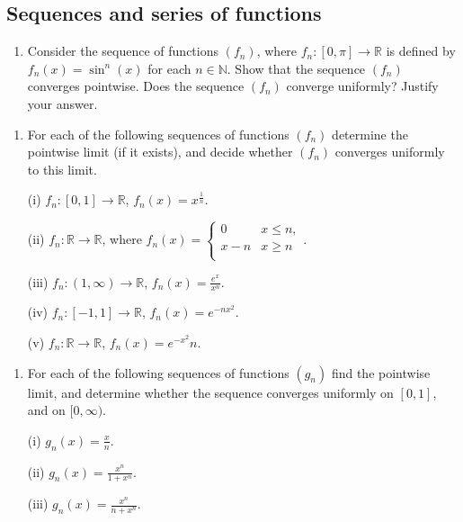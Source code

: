 \documentclass[letterpaper,10pt,english]{jupyterBook}
\begin{document}
\subsection{Sequences and series of functions}
\label{\detokenize{Problems:sequences-and-series-of-functions}}\label{\detokenize{Problems:id54}}\begin{enumerate}
%
\setcounter{enumi}{53}
\item {} 
\sphinxAtStartPar
Consider the sequence of functions  \((f_n)\), where \(f_n:[0,\pi ]\to \mathbb{R}\) is defined by \(f_n(x) = \sin^n (x)\) for each \(n\in\mathbb{N}\). Show that the sequence \((f_n)\) converges pointwise. Does the sequence \((f_n)\)  converge uniformly? Justify your answer.

\end{enumerate}
\label{\detokenize{Problems:id55}}\begin{enumerate}
%
\setcounter{enumi}{54}
\item {} 
\sphinxAtStartPar
For each of the following sequences of functions \((f_n)\) determine the pointwise limit (if it exists), and decide whether \((f_n)\) converges uniformly to this limit.

\sphinxAtStartPar
(i) \(f_n:[0,1]\to\mathbb{R}\), \(f_n (x) = x^{\frac{1}{n}}\).

\sphinxAtStartPar
(ii) \(f_n:\mathbb{R}\to\mathbb{R}\), where \(\displaystyle f_n (x)  = \left\{ \begin{array}{ll} 0 & x\leq n, \\ x-n & x\geq n \\ \end{array} \right.\).

\sphinxAtStartPar
(iii) \(f_n:(1,\infty)\to\mathbb{R}\), \(f_n(x) = \frac{e^x}{x^n}\).

\sphinxAtStartPar
(iv) \(f_n:[-1,1]\to\mathbb{R}\), \(f_n(x) = e^{-nx^2}\).

\sphinxAtStartPar
(v) \(f_n:\mathbb{R}\to\mathbb{R}\), \(f_n(x) = e^{-x^2}{n}\).

\end{enumerate}
\label{\detokenize{Problems:id56}}\begin{enumerate}
%
\setcounter{enumi}{55}
\item {} 
\sphinxAtStartPar
For each of the following sequences of functions \((g_n)\) find the pointwise limit, and determine whether the sequence converges uniformly on \([0,1]\), and on \([0,\infty)\).

\sphinxAtStartPar
(i) \(\displaystyle g_n(x) = \frac{x}{n}\).

\sphinxAtStartPar
(ii) \(\displaystyle g_n(x) = \frac{x^n}{1+x^n}\).

\sphinxAtStartPar
(iii) \(\displaystyle g_n (x) = \frac{x^n}{n+x^n}\).

\end{enumerate}
\end{document}
